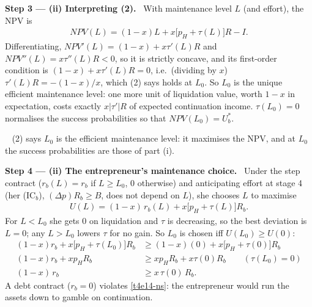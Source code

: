 \documentclass[11pt,a4paper]{article}
\newcommand{\step}[2]{\par\medskip\noindent\textbf{Step #1 --- #2.}~}
\newcommand{\answer}[1]{\par\smallskip\noindent\fbox{\textbf{Answer #1.}}~}
\begin{document}
\step{3}{(ii) Interpreting (2)} With maintenance level $L$ (and effort), the NPV is
\begin{align}
  \mathit{NPV}(L)=(1-x)L+x\big[p_H+\tau(L)\big]R-I. \label{t4e14-npv}
\end{align}
Differentiating, $\mathit{NPV}'(L)=(1-x)+x\tau'(L)R$ and $\mathit{NPV}''(L)=x\tau''(L)R<0$, so it is
strictly concave, and its first-order condition is $(1-x)+x\tau'(L)R=0$, i.e.\ (dividing by $x$)
$\tau'(L)R=-(1-x)/x$, which (2) says holds at $L_0$. So $L_0$ is the unique efficient maintenance level:
one more unit of liquidation value, worth $1-x$ in expectation, costs exactly $x|\tau'|R$ of expected
continuation income. $\tau(L_0)=0$ normalises the success probabilities so that $\mathit{NPV}(L_0)=U_b^*$.

\answer{(ii), interpret (2)} (2) says $L_0$ is the efficient maintenance level: it maximises the NPV,
and at $L_0$ the success probabilities are those of part (i).

\step{4}{(ii) The entrepreneur's maintenance choice} Under the step contract ($r_b(L)=r_b$ if $L\ge L_0$,
$0$ otherwise) and anticipating effort at stage 4 (her (IC$_b$), $(\Delta p)R_b\ge B$, does not depend
on $L$), she chooses $L$ to maximise
\begin{align}
  U(L)=(1-x)\,r_b(L)+x\big[p_H+\tau(L)\big]R_b. \label{t4e14-UL}
\end{align}
For $L<L_0$ she gets $0$ on liquidation and $\tau$ is decreasing, so the best deviation is $L=0$; any
$L>L_0$ lowers $\tau$ for no gain. So $L_0$ is chosen iff $U(L_0)\ge U(0)$:
\begin{align}
  (1-x)r_b+x\big[p_H+\tau(L_0)\big]R_b &\ge (1-x)(0)+x\big[p_H+\tau(0)\big]R_b \nonumber\\
  (1-x)r_b+xp_HR_b &\ge xp_HR_b+x\tau(0)R_b \qquad (\tau(L_0)=0) \nonumber\\
  (1-x)\,r_b &\ge x\,\tau(0)\,R_b. \tag{NS}\label{t4e14-ns}
\end{align}
A debt contract ($r_b=0$) violates \eqref{t4e14-ns}: the entrepreneur would run the assets down to gamble on
continuation.
\end{document}
